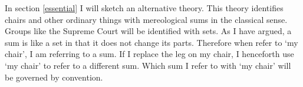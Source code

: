 \documentclass[11pt]{article}
\begin{document}
\begin{spacing}{1.5}
In section \ref{essential} I will sketch an alternative theory.  This
theory identifies chairs and other ordinary things with mereological
sums in the classical sense.  Groups like the Supreme Court will be
identified with sets.  As I have argued, a sum is like a set in that
it does not change its parts.  Therefore when refer to `my chair', I
am referring to a sum.  If I replace the leg on my chair, I henceforth
use `my chair' to refer to a different sum.  Which sum I refer to with
`my chair' will be governed by convention.

\ifstandalone
\end{spacing}


\fi
\end{document}
